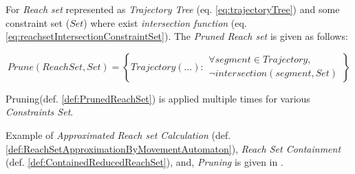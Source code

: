     \begin{definition}\label{def:PrunedReachSet} 
        For \emph{Reach set} represented as \emph{Trajectory Tree} (eq. \ref{eq:trajectoryTree}) and some constraint set ($Set$) where exist \emph{intersection function} (eq. \ref{eq:reachsetIntersectionConstraintSet}). The \emph{Pruned Reach set} is given as follows:
        
        \begin{equation}\label{eq:PrunedReachSet}
            Prune(ReachSet,Set) = 
            \left\{
                Trajectory(\dots):
                \begin{gathered} 
                \forall segment \in Trajectory,\\ \neg intersection(segment, Set) 
                \end{gathered}
            \right\}
        \end{equation}
    \end{definition}
    
    
    \begin{note} 
        Pruning(def. \ref{def:PrunedReachSet}) \cite{birmingham1988tree} is applied multiple times for various \emph{Constraints Set}. 
    
        Example of \emph{Approximated Reach set Calculation} (def. \ref{def:ReachSetApproximationByMovementAutomaton}), \emph{Reach Set Containment} (def. \ref{def:ContainedReducedReachSet}), and, \emph{Pruning} is given in \cite{gomola2017obstacle}.
    \end{note}
